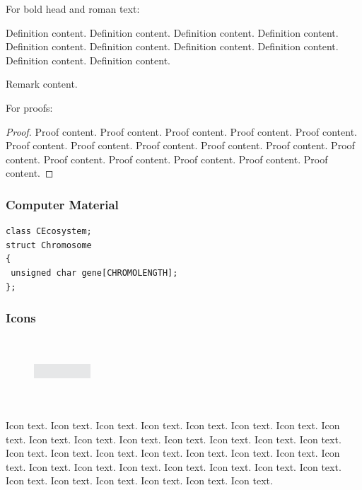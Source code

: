 For bold head and roman text:

\begin{definition}
Definition content. Definition content. Definition content.
Definition content. Definition content. Definition content. 
Definition content. 
Definition content. 
Definition content. 
Definition content. 
\end{definition}

\begin{remark}
Remark content. 
\end{remark}

For proofs:

\begin{proof}
Proof content. Proof content. Proof content. Proof content. Proof content. Proof content. Proof content. Proof content. Proof content. Proof content. Proof content. Proof content. Proof content. Proof content. Proof content. Proof content. 
\end{proof}

\subsubsection*{Computer Material}

\begin{verbatim}
class CEcosystem;
struct Chromosome
{
 unsigned char gene[CHROMOLENGTH];
};
\end{verbatim}

\clearpage

\subsubsection*{Icons}

\begin{figure}
\vspace*{-24pt}
\includegraphics[width=5pc,height=6pc]{./assets/img/01.eps}%
\end{figure}
Icon text. Icon text. Icon text. Icon text. Icon text. Icon text. Icon text. Icon text. Icon text. Icon text. Icon text. Icon text. Icon text. Icon text. Icon text. Icon text. Icon text. Icon text. Icon text. Icon text. Icon text. Icon text. Icon text. Icon text. Icon text. Icon text. Icon text. Icon text. Icon text. Icon text. Icon text. Icon text. Icon text. Icon text. Icon text. Icon text. 

